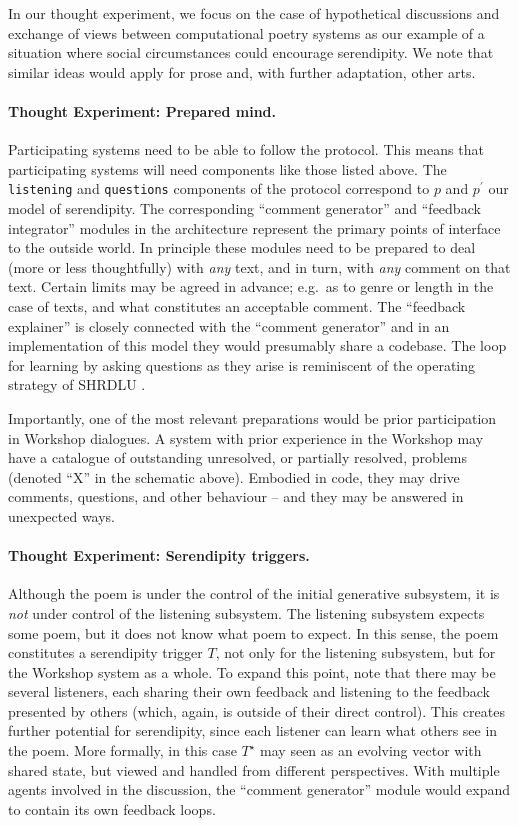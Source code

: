 \bigskip

\noindent In our thought experiment, we focus on the case of
hypothetical discussions and exchange of views between computational
poetry systems as our example of a situation where social
circumstances could encourage serendipity. We note that similar ideas
would apply for prose and, with further adaptation, other arts.

\paragraph{Thought Experiment: Prepared mind.}
Participating systems need to be able to follow the protocol.  This
means that participating systems will need components like those
listed above. The {\tt listening} and {\tt questions} components of
the protocol correspond to $p$ and $p^{\prime}$ our model of
serendipity.  The corresponding ``comment generator'' and ``feedback
integrator'' modules in the architecture represent the primary points
of interface to the outside world.  In principle these modules need to
be prepared to deal (more or less thoughtfully) with \emph{any} text,
and in turn, with \emph{any} comment on that text.  Certain limits may
be agreed in advance; e.g.~as to genre or length in the case of texts,
and what constitutes an acceptable comment.  The ``feedback
explainer'' is closely connected with the ``comment generator'' and in
an implementation of this model they would presumably share a
codebase.  The loop for learning by asking questions as they arise is
reminiscent of the operating strategy of {\sf SHRDLU}
\cite{winograd1972understanding}.

Importantly, one of the most relevant preparations would be prior
participation in Workshop dialogues.  A system with prior experience
in the Workshop may have a catalogue of outstanding unresolved, or
partially resolved, problems (denoted ``X'' in the schematic above).
Embodied in code, they may drive comments, questions, and other
behaviour -- and they may be answered in unexpected ways.

\paragraph{Thought Experiment: Serendipity triggers.}

Although the poem is under the control of the initial generative
subsystem, it is \emph{not} under control of the listening subsystem.
The listening subsystem expects some poem, but it does not know what
poem to expect.  In this sense, the poem constitutes a serendipity
trigger $T$, not only for the listening subsystem, but for the
Workshop system as a whole.
%
To expand this point, note that there may be several listeners, each
sharing their own feedback and listening to the feedback presented by
others (which, again, is outside of their direct control).  This
creates further potential for serendipity, since each listener can
learn what others see in the poem.  More formally, in this case
$T^\star$ may seen as an evolving vector with shared state, but viewed
and handled from different perspectives.  With multiple agents
involved in the discussion, the ``comment generator'' module would
expand to contain its own feedback loops.

